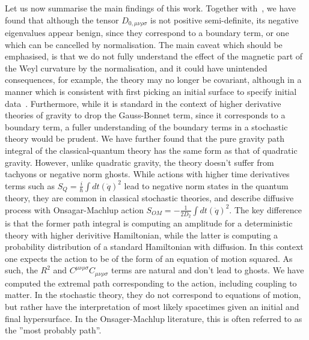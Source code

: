 \documentclass[aps,preprintnumbers,superscriptaddress,longbibliography]{revtex4-1}
\begin{document}
Let us now summarise the main findings of this work. Together with~\cite{UCLnorm2023}, we have found that although the tensor $D_{0,\mu\nu\rho\sigma}$ is not positive semi-definite, its negative eigenvalues appear benign, since they correspond to a boundary term, or one which can be cancelled by normalisation. The main caveat which should be emphasised, is that we do not fully understand the effect of the  magnetic part of the Weyl curvature by the normalisation, and it could have unintended consequences, for example, the theory may no longer be covariant, although in a manner which is consistent with first picking an initial surface to specify initial data~\cite{UCLnorm2023}. 
Furthermore, while it is standard in the context of higher derivative theories of gravity to drop the Gauss-Bonnet term, since it corresponds to a boundary term, a fuller understanding of the boundary terms in a stochastic theory would be prudent. We have further found that the pure gravity path integral of the classical-quantum theory has the same form as that of quadratic gravity. However, unlike quadratic gravity, the theory doesn't suffer from tachyons or negative norm ghosts. While actions with higher time derivatives terms such as $S_Q=\frac{i}{\hbar}\int dt (\ddot q)^2$ lead to negative norm states in the quantum theory, they are common in classical stochastic theories, and describe diffusive process with Onsagar-Machlup action $S_{OM}=-\frac{1}{2D_2}\int dt (\ddot{q})^2$. The key difference is that the former path integral is computing an amplitude for a deterministic theory with higher derivitive Hamiltonian, while the latter is computing a probability distribution of a standard Hamiltonian with diffusion. In this context one expects the action to be of the form of an equation of motion squared. As such, the $R^2$ and $C^{\mu\nu\rho\sigma}C_{\mu\nu\rho\sigma}$ terms are natural and don't lead to ghosts. We have computed the extremal path corresponding to the action, including coupling to matter. In the stochastic theory, they do not correspond to equations of motion, but rather have the interpretation of most likely spacetimes given an initial and final hypersurface. In the Onsager-Machlup literature, this is often referred to as the ''most probably path''.
\end{document}
